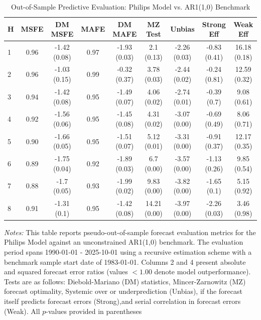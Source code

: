\begin{table}[htbp]
\centering
\caption{Out-of-Sample Predictive Evaluation: Philips Model vs. AR1(1,0) Benchmark}
\label{tab:philips_model_evaluation}
\footnotesize
\begin{tabular}{l cccccccc}
\hline\hline
\rule{0pt}{3ex}
\textbf{H} & \textbf{MSFE} & \textbf{DM MSFE} & \textbf{MAFE} & \textbf{DM MAFE} & \textbf{MZ Test} & \textbf{Unbias} & \textbf{Strong Eff} & \textbf{Weak Eff} \\[0.5ex]
\hline
\rule{0pt}{2.5ex}
1 & 0.96 & -1.42 (0.08) & 0.97 & -1.93 (0.03) & 2.1 (0.13) & -2.26 (0.03) & -0.83 (0.41) & 16.18 (0.18) \\
2 & 0.96 & -1.03 (0.15) & 0.99 & -0.32 (0.37) & 3.78 (0.03) & -2.44 (0.02) & -0.24 (0.81) & 12.59 (0.32) \\
3 & 0.94 & -1.42 (0.08) & 0.95 & -1.49 (0.07) & 4.06 (0.02) & -2.74 (0.01) & -0.39 (0.7) & 9.08 (0.61) \\
4 & 0.92 & -1.56 (0.06) & 0.95 & -1.45 (0.08) & 4.31 (0.02) & -3.07 (0.00) & -0.69 (0.49) & 8.06 (0.71) \\
5 & 0.90 & -1.66 (0.05) & 0.95 & -1.51 (0.07) & 5.12 (0.01) & -3.31 (0.00) & -0.91 (0.37) & 12.17 (0.35) \\
6 & 0.89 & -1.75 (0.04) & 0.92 & -1.89 (0.03) & 6.7 (0.00) & -3.57 (0.00) & -1.13 (0.26) & 9.85 (0.54) \\
7 & 0.88 & -1.7 (0.05) & 0.93 & -1.99 (0.02) & 9.83 (0.00) & -3.82 (0.00) & -1.65 (0.1) & 5.15 (0.92) \\
8 & 0.91 & -1.31 (0.1) & 0.95 & -1.42 (0.08) & 14.21 (0.00) & -3.97 (0.00) & -2.26 (0.03) & 3.46 (0.98) \\
\hline\hline
\end{tabular}%
\par\smallskip
\parbox{\textwidth}{\scriptsize \textit{Notes:} This table reports pseudo-out-of-sample forecast evaluation metrics for the Philips Model against an unconstrained AR1(1,0) benchmark. The evaluation period spans 1990-01-01 - 2025-10-01 using a recursive estimation scheme with a benchmark sample start date of 1983-01-01. Columns 2 and 4 present absolute and squared forecast error ratios (values $< 1.00$ denote model outperformance). Tests are as follows: Diebold-Mariano (DM) statistics, Mincer-Zarnowitz (MZ) forecast optimality, Systemic over or underprediction (Unbias), if the forecast itself predicts forecast errors (Strong),and serial correlation in forecast errors (Weak). All $p$-values provided in parentheses}
\end{table}
